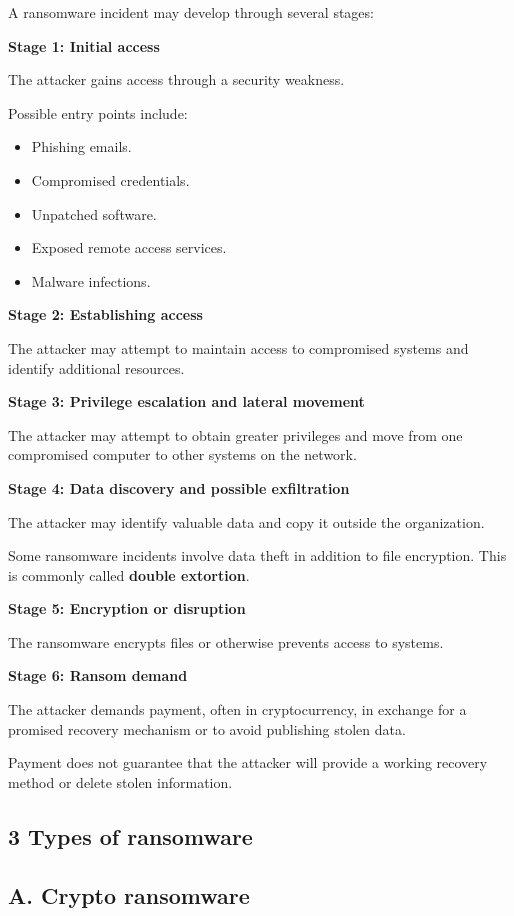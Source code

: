 A ransomware incident may develop through several stages:

\textbf{Stage 1: Initial access}

The attacker gains access through a security weakness.

Possible entry points include:

\begin{itemize}
\item Phishing emails.
\item Compromised credentials.
\item Unpatched software.
\item Exposed remote access services.
\item Malware infections.
\end{itemize}

\textbf{Stage 2: Establishing access}

The attacker may attempt to maintain access to compromised systems and identify additional resources.

\textbf{Stage 3: Privilege escalation and lateral movement}

The attacker may attempt to obtain greater privileges and move from one compromised computer to other systems on the network.

\textbf{Stage 4: Data discovery and possible exfiltration}

The attacker may identify valuable data and copy it outside the organization.

Some ransomware incidents involve data theft in addition to file encryption. This is commonly called \textbf{double extortion}.

\textbf{Stage 5: Encryption or disruption}

The ransomware encrypts files or otherwise prevents access to systems.

\textbf{Stage 6: Ransom demand}

The attacker demands payment, often in cryptocurrency, in exchange for a promised recovery mechanism or to avoid publishing stolen data.

Payment does not guarantee that the attacker will provide a working recovery method or delete stolen information.

\subsection{3 Types of ransomware}

\subsection{A. Crypto ransomware}


